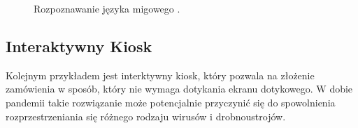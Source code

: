 \begin{figure}[H]
    \centering
    \hfill
    \hfill
    \caption{Rozpoznawanie języka migowego .}
\end{figure}

\subsection{Interaktywny Kiosk}
\quad Kolejnym przykładem jest interktywny kiosk, który pozwala na złożenie zamówienia w sposób, który nie wymaga dotykania ekranu dotykowego. W dobie pandemii takie rozwiązanie może potencjalnie przyczynić się do spowolnienia rozprzestrzeniania się różnego rodzaju wirusów i drobnoustrojów. 


